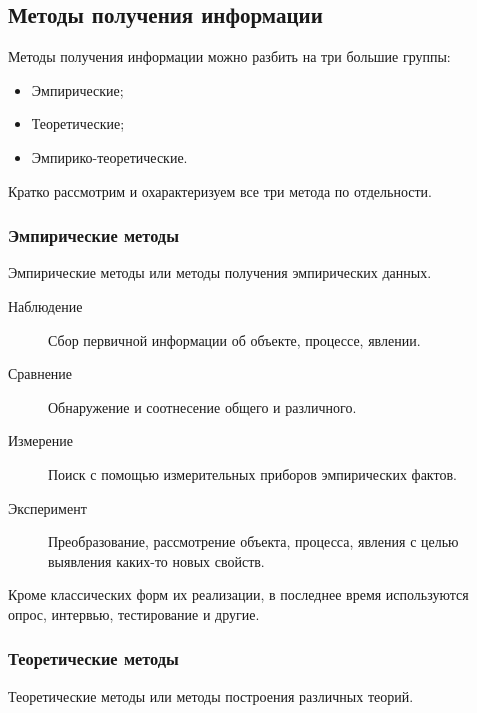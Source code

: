 \subsection{Методы получения информации}\label{subsec:methods-of-information-retrieval}

\noindent
Методы получения информации можно разбить на три большие группы:

\begin{itemize}
    \item Эмпирические;
    \item Теоретические;
    \item Эмпирико-теоретические.
\end{itemize}

\noindent
Кратко рассмотрим и охарактеризуем все три метода по отдельности.

\subsubsection*{Эмпирические методы}\label{subsubsec:empirical-methods}

Эмпирические методы или методы получения эмпирических данных.

\begin{description}
    \item [Наблюдение]
          Сбор первичной информации об объекте, процессе, явлении.
    \item [Сравнение]
          Обнаружение и соотнесение общего и различного.
    \item [Измерение]
          Поиск с помощью измерительных приборов эмпирических фактов.
    \item [Эксперимент]
          Преобразование, рассмотрение объекта, процесса, явления с целью выявления каких-то новых свойств.
\end{description}

Кроме классических форм их реализации, в последнее время используются опрос, интервью, тестирование и другие.

\subsubsection*{Теоретические методы}\label{subsubsec:theoretical-methods}

Теоретические методы или методы построения различных теорий.


